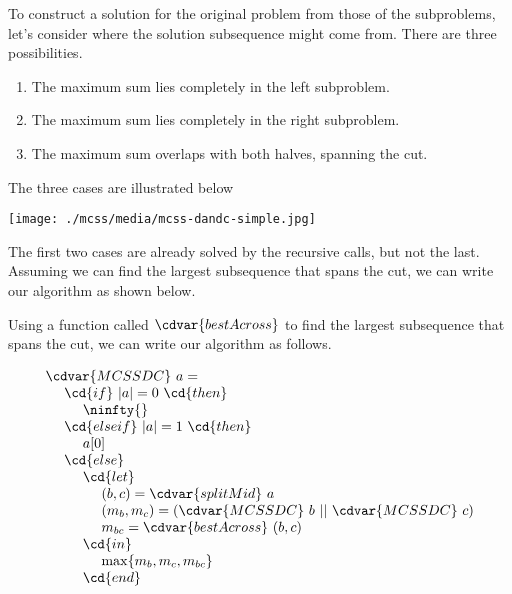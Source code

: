 \begin{gram}
To construct a solution for the original problem from those of the
subproblems, let's consider where the solution subsequence might come
from.  There are three possibilities.
\begin{enumerate}
\item  
The maximum sum lies completely in the left subproblem.

\item 
The maximum sum lies completely in the right subproblem.

\item
The maximum sum overlaps with both halves, spanning the cut.
\end{enumerate}

The three cases are illustrated below

\begin{center}
\texttt{[image: ./mcss/media/mcss-dandc-simple.jpg]}
\end{center}

The first two cases are already solved by the recursive calls, but not
the last.  Assuming we can find the largest subsequence that spans the
cut, we can write our algorithm as shown below.
\end{gram}


\begin{algorithm}
\label{alg:mcss::dc::first}
Using a function called $\cdvar{bestAcross}$ to find the largest
subsequence that spans the cut, we can write our algorithm as follows.

\[
\begin{array}{l}
\cdvar{MCSSDC}~a =
\\
~~~~\cd{if}~ |a| = 0~\cd{then}
\\
~~~~~~~~\ninfty{}
\\
~~~~\cd{else if}~|a| = 1 ~\cd{then}
\\ 
~~~~~~~~a[0]
\\
~~~~\cd{else}
\\ 
~~~~~~~~\cd{let}
\\ 
~~~~~~~~~~~~(b, c)  = \cdvar{splitMid}~a
\\ 
~~~~~~~~~~~~(m_b, m_c) = \left( \cdvar{MCSSDC}~b \ ||\ \cdvar{MCSSDC}~c \right)
\\ 
~~~~~~~~~~~~m_{bc} = \cdvar{bestAcross}~(b, c)
\\ 
~~~~~~~~\cd{in}
\\ 
~~~~~~~~~~~~\max\{m_b, m_c, m_{bc}\}
\\ 
~~~~~~~~\cd{end}
\end{array} 
\]
\end{algorithm}

